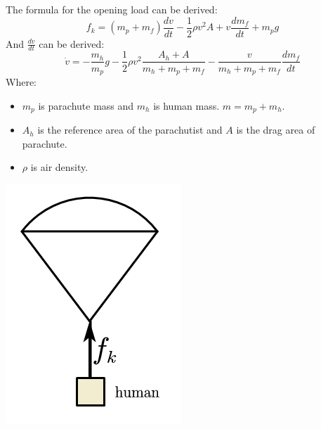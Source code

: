 \documentclass[12pt]{article}
\begin{document}
\begin{minipage}{0.6\linewidth}
    The formula for the opening load can be derived\cite{gao2018achievements}: 
    \[ f_k = (m_p + m_f )\frac{dv}{dt} - \frac{1}{2}\rho v^2A + v\frac{dm_f}{dt} + m_p g \]
    And $\frac{dv}{dt}$ can be derived:
    \[ \dot{v} = -\frac{m_h}{m_p}g - \frac{1}{2}\rho v^2\frac{A_h + A}{m_h + m_p + m_f} - \frac{v}{m_h + m_p + m_f}\frac{dm_f}{dt}\]
    Where:
    \begin{itemize}
        \item $m_p$ is parachute mass and  $m_h$ is human mass. $m = m_p + m_h$.
        \item $A_h$ is the reference area of the parachutist and $A$ is the drag area of parachute. 
        \item $\rho $ is air density.
    \end{itemize}

\end{minipage}
\hfill
\begin{minipage}{0.3\linewidth}
    \includegraphics[width = \linewidth]{image/006.png}
\end{minipage}
\end{document}
